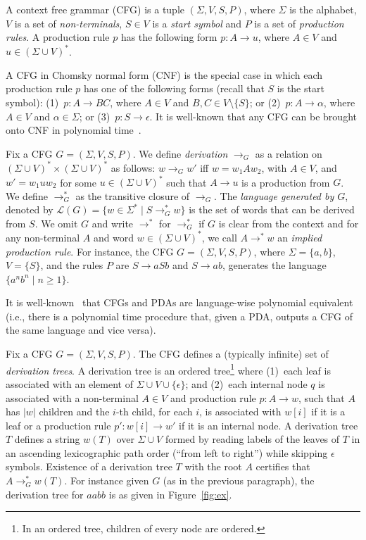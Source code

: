 \documentclass{CSML}
\newcommand{\lang}{\mathcal{L}}
\begin{document}
A context free grammar (CFG) is a tuple $(\Sigma,V,S,P)$, where $\Sigma$ is the alphabet, $V$ is a set of {\em non-terminals}, $S \in V$ is a {\em start symbol} and $P$ is a set of {\em production rules}.
A production rule $p$ has the following form $p: A\rightarrow u$, where $A\in V$ and $u \in (\Sigma \cup V)^*$.

A CFG in Chomsky normal form (CNF) is the special case in which each production rule $p$ has one of the following forms (recall that $S$ is the start symbol): (1)~$p: A\rightarrow BC$, where $A\in V$ and $B,C\in V\setminus \{S\}$; or (2)~$p:A\rightarrow \alpha$, where $A\in V$ and $\alpha\in\Sigma$; or (3)~$p: S\rightarrow \epsilon$. It is well-known that any CFG can be brought onto CNF in polynomial time~\cite{C59}.

 Fix a CFG $G=(\Sigma,V,S,P)$. We define \emph{derivation} $\rightarrow_G$ as a relation on $(\Sigma \cup V)^*\times (\Sigma \cup V)^*$ as follows:
$w \rightarrow_G w'$ iff $w = w_1 A w_2$, with $A \in V$, and $w' = w_1 u w_2$ for some $u \in (\Sigma \cup V)^*$ such that $A \rightarrow u$ is a production from $G$.
We define $\rightarrow_G^*$ as the transitive closure of $\rightarrow_G$. The \emph{language generated by $G$}, denoted by $\lang(G) = \{ w \in \Sigma^* \mid  S \rightarrow_G^* w \}$ is the set of words that can be derived from $S$.  
We omit $G$ and write $\rightarrow^*$ for $\rightarrow_G^*$ if $G$ is clear from the context and for any non-terminal $A$ and word $w\in (\Sigma \cup V)^*$, we call $A\rightarrow^* w$ an {\em implied production rule}.
For instance, the CFG $G = (\Sigma,V,S,P)$, where $\Sigma = \{a,b\}$,  $V=\{S\}$, and the rules $P$ are $S\rightarrow a S b$ and $S\rightarrow ab$, generates the language $\{a^nb^n\mid n\geq 1\}$.

 It is well-known~\cite{HU79} that CFGs and PDAs are language-wise polynomial equivalent (i.e., there is a polynomial time procedure that, given a PDA,  outputs a CFG of the same language and vice versa).

Fix a CFG $G = (\Sigma,V,S,P)$. The CFG defines a (typically infinite) set of {\em derivation trees}. 
A derivation tree is an ordered tree\footnote{In an ordered tree, children 
of every node are ordered.} where (1)~each leaf is associated with an element of $\Sigma\cup V \cup \{\epsilon\}$; and (2)~each internal node $q$ is associated with a non-terminal $A \in V$ and production rule $p: A\rightarrow w$, such that $A$ has $|w|$ children and the $i$-th child, for each $i$, is associated with $w[i]$ if it is a leaf or
a production rule $p' : w[i] \rightarrow w'$ if it is an internal node.
A derivation tree $T$ defines a string $w(T)$ over $\Sigma\cup V$ formed by reading labels of the leaves of $T$ in an ascending lexicographic path order (``from left to right'') while skipping $\epsilon$ symbols. Existence of a derivation tree $T$ with the root $A$ certifies that 
$A \rightarrow_G^* w(T)$. 
For instance given $G$ (as in the previous paragraph), the  derivation tree for $aabb$ is as given in Figure~\ref{fig:ex}.
\end{document}
